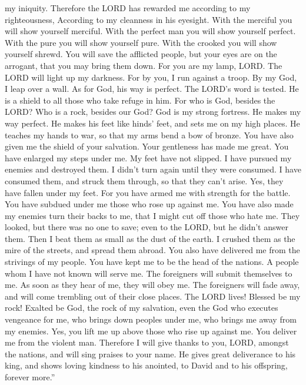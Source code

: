 my iniquity.  Therefore the LORD has rewarded me
according to my righteousness, According to my cleanness in his
eyesight.  With the merciful you will show yourself
merciful. With the perfect man you will show yourself perfect.
 With the pure you will show yourself pure. With the
crooked you will show yourself shrewd.  You will save the
afflicted people, but your eyes are on the arrogant, that you may bring
them down.  For you are my lamp, LORD. The LORD will
light up my darkness.  For by you, I run against a troop.
By my God, I leap over a wall.  As for God, his way is
perfect. The LORD's word is tested. He is a shield to all those who take
refuge in him.  For who is God, besides the LORD? Who is
a rock, besides our God?  God is my strong fortress. He
makes my way perfect.  He makes his feet like hinds'
feet, and sets me on my high places.  He teaches my hands
to war, so that my arms bend a bow of bronze.  You have
also given me the shield of your salvation. Your gentleness has made me
great.  You have enlarged my steps under me. My feet have
not slipped.  I have pursued my enemies and destroyed
them. I didn't turn again until they were consumed.  I
have consumed them, and struck them through, so that they can't arise.
Yes, they have fallen under my feet.  For you have armed
me with strength for the battle. You have subdued under me those who
rose up against me.  You have also made my enemies turn
their backs to me, that I might cut off those who hate me.
 They looked, but there was no one to save; even to the
LORD, but he didn't answer them.  Then I beat them as
small as the dust of the earth. I crushed them as the mire of the
streets, and spread them abroad.  You also have delivered
me from the strivings of my people. You have kept me to be the head of
the nations. A people whom I have not known will serve me.
 The foreigners will submit themselves to me. As soon as
they hear of me, they will obey me.  The foreigners will
fade away, and will come trembling out of their close places.
 The LORD lives! Blessed be my rock! Exalted be God, the
rock of my salvation,  even the God who executes
vengeance for me, who brings down peoples under me,  who
brings me away from my enemies. Yes, you lift me up above those who rise
up against me. You deliver me from the violent man. 
Therefore I will give thanks to you, LORD, amongst the nations, and will
sing praises to your name.  He gives great deliverance to
his king, and shows loving kindness to his anointed, to David and to his
offspring, forever more.''

